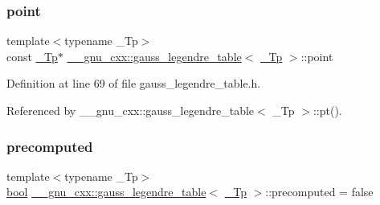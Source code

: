 \mbox{\label{struct____gnu__cxx_1_1gauss__legendre__table_a2b2ec503ecb0fa74ccdba5b81e4edcd0}} 
\subsubsection{\texorpdfstring{point}{point}}
{\footnotesize\ttfamily template$<$typename \+\_\+\+Tp$>$ \\
const \hyperlink{namespace____gnu__cxx_a3b19a9c800ca194374ef9172290f7d79}{\+\_\+\+Tp}$\ast$ \hyperlink{struct____gnu__cxx_1_1gauss__legendre__table}{\+\_\+\+\_\+gnu\+\_\+cxx\+::gauss\+\_\+legendre\+\_\+table}$<$ \hyperlink{namespace____gnu__cxx_a3b19a9c800ca194374ef9172290f7d79}{\+\_\+\+Tp} $>$\+::point}



Definition at line 69 of file gauss\+\_\+legendre\+\_\+table.\+h.



Referenced by \+\_\+\+\_\+gnu\+\_\+cxx\+::gauss\+\_\+legendre\+\_\+table$<$ \+\_\+\+Tp $>$\+::pt().

\mbox{\label{struct____gnu__cxx_1_1gauss__legendre__table_acbcd2eeb79842a232207882c5a4d01c0}} 
\subsubsection{\texorpdfstring{precomputed}{precomputed}}
{\footnotesize\ttfamily template$<$typename \+\_\+\+Tp$>$ \\
\hyperlink{namespace____gnu__cxx_ae83aca57f97767d5d09188718728a0ac}{bool} \hyperlink{struct____gnu__cxx_1_1gauss__legendre__table}{\+\_\+\+\_\+gnu\+\_\+cxx\+::gauss\+\_\+legendre\+\_\+table}$<$ \hyperlink{namespace____gnu__cxx_a3b19a9c800ca194374ef9172290f7d79}{\+\_\+\+Tp} $>$\+::precomputed = false}



